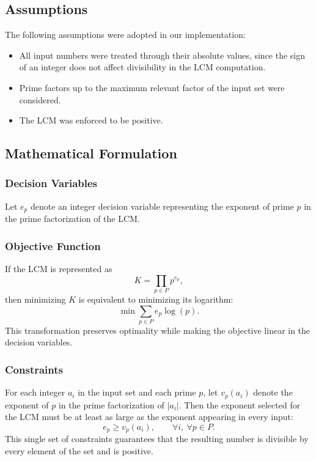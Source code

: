\documentclass[11pt,a4paper]{article}
\begin{document}
\subsection*{Assumptions}

The following assumptions were adopted in our implementation:
\begin{itemize}
    \item All input numbers were treated through their absolute values, since the sign of an integer does not affect divisibility in the LCM computation.
    \item Prime factors up to the maximum relevant factor of the input set were considered.
    \item The LCM was enforced to be positive.
\end{itemize}

\subsection*{Mathematical Formulation}

\subsubsection*{Decision Variables}

Let $e_p$ denote an integer decision variable representing the exponent of prime $p$ in the prime factorization of the LCM.

\subsubsection*{Objective Function}

If the LCM is represented as
\[
K = \prod_{p \in P} p^{e_p},
\]
then minimizing $K$ is equivalent to minimizing its logarithm:
\[
\min \sum_{p \in P} e_p \log(p).
\]
This transformation preserves optimality while making the objective linear in the decision variables.

\subsubsection*{Constraints}

For each integer $a_i$ in the input set and each prime $p$, let $v_p(a_i)$ denote the exponent of $p$ in the prime factorization of $|a_i|$. Then the exponent selected for the LCM must be at least as large as the exponent appearing in every input:
\[
e_p \geq v_p(a_i), \qquad \forall i,\ \forall p \in P.
\]
This single set of constraints guarantees that the resulting number is divisible by every element of the set and is positive.
\end{document}
